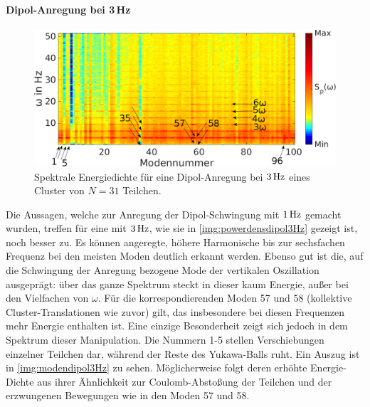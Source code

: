           \paragraph{Dipol-Anregung bei 3\,Hz}

            \begin{figure}[!b]
              \centering
              \includegraphics[width=\textwidth]{figs/auswertung/manipulation/dipol3Hzpowerdens.png}
              \caption{Spektrale Energiedichte für eine Dipol-Anregung  bei $\unit[3]{Hz}$ eines Cluster von $N=31$ Teilchen.}\label{img:powerdensdipol3Hz}
            \end{figure}

          Die Aussagen, welche zur Anregung der Dipol-Schwingung mit $\unit[1]{Hz}$ gemacht wurden, treffen für eine mit $\unit[3]{Hz}$, wie sie in \autoref{img:powerdensdipol3Hz} gezeigt ist, noch besser zu. Es können angeregte, höhere Harmonische bis zur sechsfachen Frequenz bei den meisten Moden deutlich erkannt werden. Ebenso gut ist die, auf die Schwingung der Anregung bezogene Mode der vertikalen Oszillation ausgeprägt: über das ganze Spektrum steckt in dieser kaum Energie, außer bei den Vielfachen von $\omega$. Für die korrespondierenden Moden 57 und 58 (kollektive Cluster-Translationen wie zuvor) gilt, das insbesondere bei diesen Frequenzen mehr Energie enthalten ist. Eine einzige Besonderheit zeigt sich jedoch in dem Spektrum dieser Manipulation. Die Nummern 1-5 stellen Verschiebungen einzelner Teilchen dar, während der Reste des Yukawa-Balls ruht. Ein Auszug ist in \autoref{img:modendipol3Hz} zu sehen. Möglicherweise folgt deren erhöhte Energie-Dichte aus ihrer Ähnlichkeit zur Coulomb-Abstoßung der Teilchen und der erzwungenen Bewegungen wie in den Moden 57 und 58.

